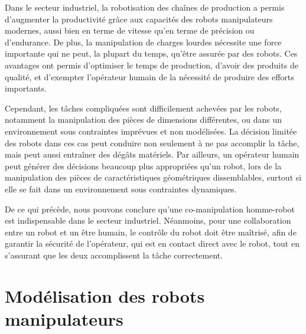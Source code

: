 \documentclass[12pt,a4paper,twoside]{report}
\begin{document}
Dans le secteur industriel, la robotisation des chaînes de production a permis d'augmenter la productivité grâce aux capacités des robots manipulateurs modernes, aussi bien en terme de vitesse qu'en terme de précision ou d'endurance. De plus, la manipulation de charges lourdes nécessite une force importante qui ne peut, la plupart du temps, qu'être assurée par des robots. Ces avantages ont permis d'optimiser le temps de production, d'avoir des produits de qualité, et d'exempter l'opérateur humain de la nécessité de produire des efforts importants.

Cependant, les tâches compliquées sont difficilement achevées par les robots, notamment la manipulation des pièces de dimensions différentes, ou dans un environnement sous contraintes imprévues et non modélisées. La décision limitée des robots dans ces cas peut conduire non seulement à ne pas accomplir la tâche, mais peut aussi entraîner des dégâts matériels. Par ailleurs, un opérateur humain peut générer des décisions beaucoup plus appropriées qu'un robot, lors de la manipulation des pièces de caractéristiques géométriques dissemblables, surtout si elle se fait dans un environnement sous contraintes dynamiques.

De ce qui précède, nous pouvons conclure qu'une co-manipulation homme-robot est indispensable dans le secteur industriel. Néanmoins, pour une collaboration entre un robot et un être humain, le contrôle du robot doit être maîtrisé, afin de garantir la sécurité de l'opérateur, qui est en contact direct avec le robot, tout en s'assurant que les deux accomplissent la tâche correctement.

\chapter{Modélisation des robots manipulateurs} \label{Chapitre_2}
\minitoc
\end{document}
